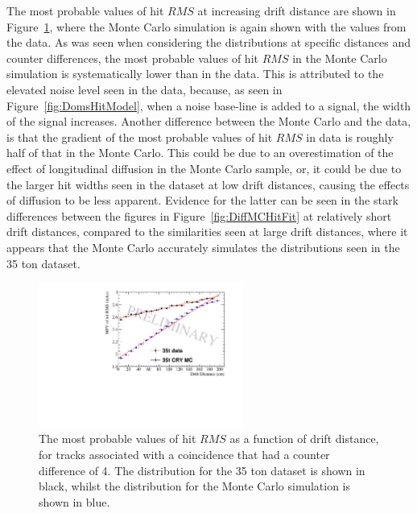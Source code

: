 The most probable values of hit $RMS$ at increasing drift distance are shown in Figure~\ref{fig:DiffMCDataCompFit}, where the Monte Carlo simulation is again shown with the values from the data. As was seen when considering the distributions at specific distances and counter differences, the most probable values of hit $RMS$ in the Monte Carlo simulation is systematically lower than in the data. This is attributed to the elevated noise level seen in the data, because, as seen in Figure~\ref{fig:DomsHitModel}, when a noise base-line is added to a signal, the width of the signal increases. Another difference between the Monte Carlo and the data, is that the gradient of the most probable values of hit $RMS$ in data is roughly half of that in the Monte Carlo. This could be due to an overestimation of the effect of longitudinal diffusion in the Monte Carlo sample, or, it could be due to the larger hit widths seen in the dataset at low drift distances, causing the effects of diffusion to be less apparent. Evidence for the latter can be seen in the stark differences between the figures in Figure~\ref{fig:DiffMCHitFit} at relatively short drift distances, compared to the similarities seen at large drift distances, where it appears that the Monte Carlo accurately simulates the distributions seen in the 35 ton dataset. \\

\begin{figure}[h!]
  \centering
  \includegraphics[width=0.6\textwidth]{CounterDiff4_Overlay}
  \caption[The drift distance dependence of diffusion in the 35 ton dataset and Monte Carlo for coincidences with a counter difference of 4]
          {The most probable values of hit $RMS$ as a function of drift distance, for tracks associated with a coincidence that had a counter difference of 4. The distribution for the 35 ton dataset is shown in black, whilst the distribution for the Monte Carlo simulation is shown in blue.}
  \label{fig:DiffMCDataCompFit}
\end{figure}


